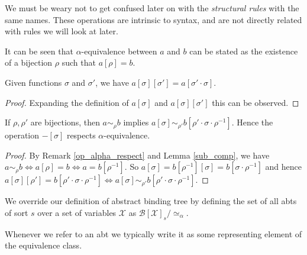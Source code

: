 \begin{remark}
    We must be weary not to get confused later on with the \emph{structural rules} with the same names. These operations are intrinsic to syntax, and are not directly related with rules we will look at later.
\end{remark}

\begin{remark}\label{op_alpha_respect}
    It can be seen that $\alpha$-equivalence between $a$ and $b$ can be stated as the existence of a bijection $\rho$ such that $a[\rho] = b$.
\end{remark}

\begin{lemma}\label{sub_comp}
    Given functions $\sigma$ and $\sigma'$, we have $a[\sigma][\sigma'] = a[\sigma' \cdot \sigma]$.
\end{lemma}

\begin{proof}
    Expanding the definition of $a[\sigma]$ and $a[\sigma][\sigma']$ this can be observed.
\end{proof}

\begin{lemma}\label{sub_alpha}
    If $\rho, \rho'$ are bijections, then $a \sim_\rho b$ implies $a[\sigma] \sim_{\rho'} b[\rho ' \cdot \sigma \cdot \rho^{-1}]$. Hence the operation $-[\sigma]$ respects $\alpha$-equivalence.
\end{lemma}

\begin{proof}
    By Remark \ref{op_alpha_respect} and Lemma \ref{sub_comp}, we have $a \sim_\rho b \iff a[\rho] = b \iff a = b[\rho^{-1}]$. So $a[\sigma] = b[\rho^{-1}][\sigma]=b[\sigma \cdot \rho^{-1}]$ and hence  $a[\sigma][\rho']=b[\rho' \cdot \sigma \cdot \rho^{-1}]\iff a[\sigma] \sim_{\rho'} b[\rho' \cdot \sigma \cdot \rho^{-1}]$.
\end{proof}

%
\begin{defin}
    We override our definition of abstract binding tree by defining the set of all abts of sort $s$ over a set of variables $\mathcal{X}$ as $\mathcal{B}[\mathcal{X}]_s / \simeq_{\alpha}$.
\end{defin}

\begin{remark}
    Whenever we refer to an abt we typically write it as some representing element of the equivalence class.
\end{remark}

